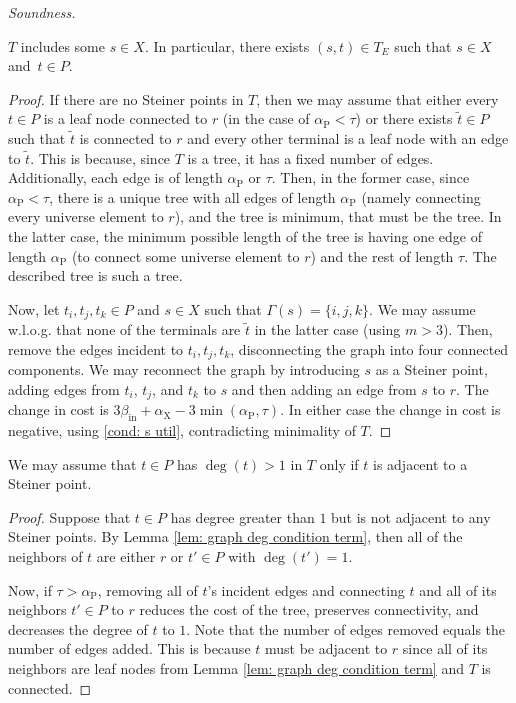 \documentclass{article}\providecommand{\DeclareRedundantLanguages}[2]{}\usepackage[a4paper,margin=20mm]{geometry}
\newcommand{\1}{\textbf{1}}
\newcommand{\td}{\tau}
\newcommand{\srd}{\alpha_{\text{X}}}
\newcommand{\trd}{\alpha_{\text{P}}}
\renewcommand{\tilde}{\widetilde}
\begin{document}
\begin{paragraph}{\textit{Soundness.}}
 \begin{lemma} \label{lem: graph st existence}
 $T$ includes some $s \in X$. In particular, there exists $(s,t) \in T_E$ such that $s \in X$ and~$t \in P$.
 \end{lemma}
 \begin{proof}
 If there are no Steiner points in $T$, then we may assume that either every $t \in P$ is a leaf node connected to $r$ (in the case of $\trd < \td$) or there exists $\tilde{t} \in P$ such that $\tilde{t}$ is connected to $r$ and every other terminal is a leaf node with an edge to $\tilde{t}$. This is because, since $T$ is a tree, it has a fixed number of edges. Additionally, each edge is of length $\trd$ or $\td$. Then, in the former case, since $\trd < \td$, there is a unique tree with all edges of length $\trd$ (namely connecting every universe element to $r$), and the tree is minimum, that must be the tree. In the latter case, the minimum possible length of the tree is having one edge of length $\trd$ (to connect some universe element to $r$) and the rest of length $\td$. The described tree is such a tree. 
 
 Now, let $t_i, t_j, t_k \in P$ and $s \in X$ such that $\Gamma(s) = \{i,j,k\}$. We may assume w.l.o.g. that none of the terminals are $\tilde{t}$ in the latter case (using $m >3$). Then, remove the edges incident to $t_i, t_j, t_k$, disconnecting the graph into four connected components. We may reconnect the graph by introducing $s$ as a Steiner point, adding edges from $t_i$, $t_j$, and $t_k$ to $s$ and then adding an edge from $s$ to $r$. The change in cost is $3\beta_{\text{in}} + \srd - 3\min(\trd, \td)$. In either case the change in cost is negative, using \ref{cond: s util}, contradicting minimality of $T$.
 \end{proof}
 

  \begin{lemma} \label{lem: graph term leaf node}
 We may assume that $t \in P$ has $\deg(t) >1$ in $T$ only if $t$ is adjacent to a Steiner point.
 \end{lemma}
 \begin{proof}
  Suppose that $t \in P$ has degree greater than $1$ but is not adjacent to any Steiner points. By Lemma \ref{lem: graph deg condition term}, then all of the neighbors of $t$ are either $r$ or $t' \in P$ with $\deg(t') = 1$. 
  
  Now, if $\td > \trd$, removing all of $t$'s incident edges and connecting $t$ and all of its neighbors $t' \in P$ to $r$ reduces the cost of the tree, preserves connectivity, and decreases the degree of $t$ to $1$. Note that the number of edges removed equals the number of edges added. This is because $t$ must be adjacent to $r$ since all of its neighbors are leaf nodes from Lemma \ref{lem: graph deg condition term} and $T$ is connected.
  

\end{proof}
\end{paragraph}
\end{document}
